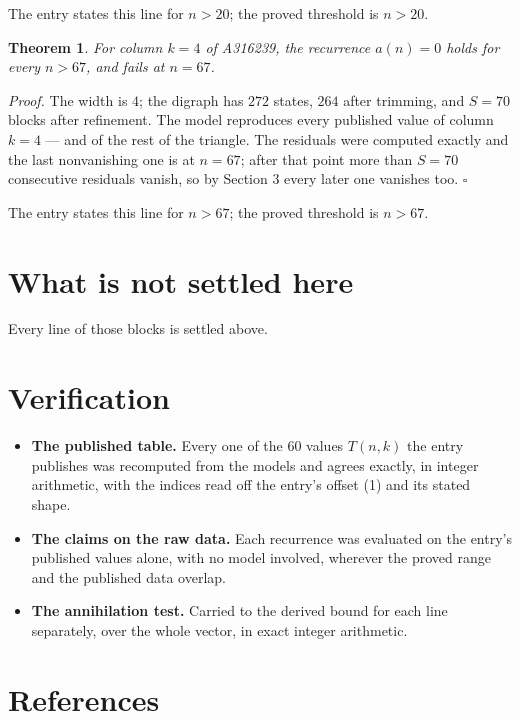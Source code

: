 \documentclass[11pt]{article}
\newtheorem{theorem}{Theorem}
\theoremstyle{definition}
\begin{document}
The entry states this line for $n > 20$; the proved threshold is $n > 20$.

\begin{theorem} For column $k = 4$ of A316239, the recurrence $a(n) = 0$ holds for every $n > 67$, and fails at $n = 67$.\end{theorem}

{\itshape Proof.} The width is $4$; the digraph has $272$ states, $264$ after trimming, and $S = 70$ blocks after refinement. The model reproduces every published value of column $k = 4$ --- and of the rest of the triangle. The residuals were computed exactly and the last nonvanishing one is at $n = 67$; after that point more than $S = 70$ consecutive residuals vanish, so by Section 3 every later one vanishes too. $\square$

The entry states this line for $n > 67$; the proved threshold is $n > 67$.

\section{What is not settled here}

Every line of those blocks is settled above.

\section{Verification}

\begin{itemize}

\item {\bfseries The published table.} Every one of the 60 values $T(n,k)$ the entry publishes was recomputed from the models and agrees exactly, in integer arithmetic, with the indices read off the entry's offset (1) and its stated shape.

\item {\bfseries The claims on the raw data.} Each recurrence was evaluated on the entry's published values alone, with no model involved, wherever the proved range and the published data overlap.

\item {\bfseries The annihilation test.} Carried to the derived bound for each line separately, over the whole vector, in exact integer arithmetic.

\end{itemize}

\section{References}
\end{document}
